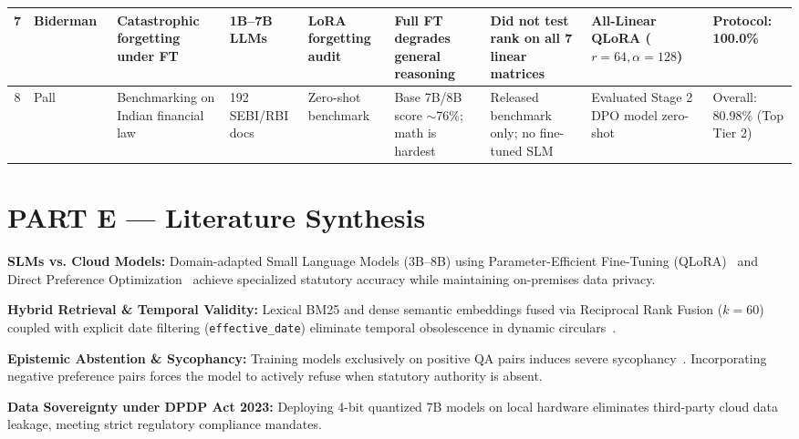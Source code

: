 \documentclass[11pt,a4paper]{article}
\begin{document}
\begin{table}[h!]
\begin{tabularx}{\textwidth}{|c|l|X|l|l|X|X|X|l|}
7 & Biderman~\cite{biderman2024lora} & Catastrophic forgetting under FT & 1B--7B LLMs & LoRA forgetting audit & Full FT degrades general reasoning & Did not test rank on all 7 linear matrices & All-Linear QLoRA ($r=64, \alpha=128$) & Protocol: 100.0\% \\ \hline
8 & Pall~\cite{pall2026indiafinbench} & Benchmarking on Indian financial law & 192 SEBI/RBI docs & Zero-shot benchmark & Base 7B/8B score $\sim$76\%; math is hardest & Released benchmark only; no fine-tuned SLM & Evaluated Stage 2 DPO model zero-shot & Overall: 80.98\% (Top Tier 2) \\ \hline
\end{tabularx}
\end{table}

\section*{PART E --- Literature Synthesis}
\textbf{SLMs vs. Cloud Models:} Domain-adapted Small Language Models (3B--8B) using Parameter-Efficient Fine-Tuning (QLoRA)~\cite{biderman2024lora} and Direct Preference Optimization~\cite{rafailov2023dpo} achieve specialized statutory accuracy while maintaining on-premises data privacy.

\textbf{Hybrid Retrieval \& Temporal Validity:} Lexical BM25 and dense semantic embeddings fused via Reciprocal Rank Fusion ($k=60$) coupled with explicit date filtering (\texttt{effective\_date}) eliminate temporal obsolescence in dynamic circulars~\cite{kim2026jurisdiction}.

\textbf{Epistemic Abstention \& Sycophancy:} Training models exclusively on positive QA pairs induces severe sycophancy~\cite{magesh2025hallucination}. Incorporating negative preference pairs forces the model to actively refuse when statutory authority is absent.

\textbf{Data Sovereignty under DPDP Act 2023:} Deploying 4-bit quantized 7B models on local hardware eliminates third-party cloud data leakage, meeting strict regulatory compliance mandates.

\end{document}
